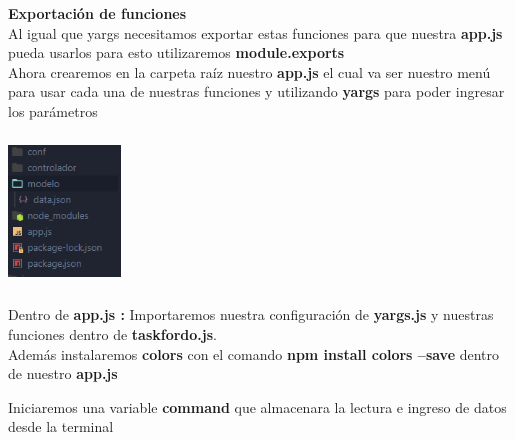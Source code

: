 \documentclass{report}
\begin{document}
\textbf{Exportación de funciones}\\

Al igual que yargs necesitamos exportar estas funciones para que nuestra \textbf{app.js} pueda usarlos para esto utilizaremos \textbf{module.exports{}}
\\
Ahora crearemos en la carpeta raíz nuestro \textbf{app.js} el cual va ser nuestro menú para usar cada una de nuestras funciones y utilizando \textbf{yargs} para poder ingresar los parámetros
\begin{center}
  \includegraphics[width=3cm, height=4cm]{5.png}
\end{center} 

Dentro de \textbf{app.js :}
Importaremos nuestra configuración de \textbf{yargs.js} y nuestras funciones dentro de \textbf{task\-for\-do.js}.\\
Además instalaremos \textbf{colors} con el comando \textbf{npm install colors --save} dentro de nuestro \textbf{app.js}

Iniciaremos una variable \textbf{command} que almacenara la lectura e ingreso de datos desde la terminal

\end{document}
